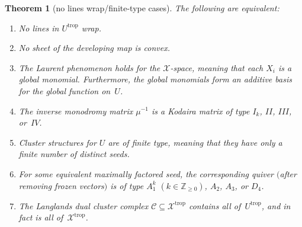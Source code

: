 \documentclass[10pt,a4paper]{amsart}
\numberwithin{equation}{section}
\numberwithin{figure}{section}
\numberwithin{table}{section}
\DeclareMathOperator{\trop}{trop}
\let\bb=\mathbb
\let\s=\mathcal
\newtheorem{thm}{Theorem}[section]
\theoremstyle{definition}
\begin{document}
\begin{thm}[no lines wrap/finite-type cases]\label{no-wrap}
The following are equivalent:
\begin{enumerate}\itemsep=0pt
\item[$1.$] No {lines} in $U^{\trop}$ wrap.
\item[$2.$] No sheet of the {developing map} is convex.
\item[$3.$] The Laurent phenomenon holds for the $\s{X}$-space, meaning that each $X_i$ is a global monomial. Furthermore, the {global monomials} form an additive basis for the global function on~$U$.
\item[$4.$] The inverse {monodromy} matrix $\mu^{-1}$ is a Kodaira matrix of type $I_k$, $II$, $III$, or~$IV$.
\item[$5.$] Cluster structures for $U$ are of {finite type}, meaning that they have only a finite number of distinct seeds.
\item[$6.$] For some equivalent maximally factored seed, the corresponding quiver $($after removing frozen vectors$)$ is of type $A_1^k$ $(k\in \bb{Z}_{\geq 0})$, $A_2$, $A_3$, or $D_4$.
\item[$7.$] The Langlands dual {cluster complex} $\s{C}\subseteq \s{X}^{\trop}$ contains all of~$U^{\trop}$, and in fact is all of~$\s{X}^{\trop}$.
\end{enumerate}
\end{thm}
\end{document}

